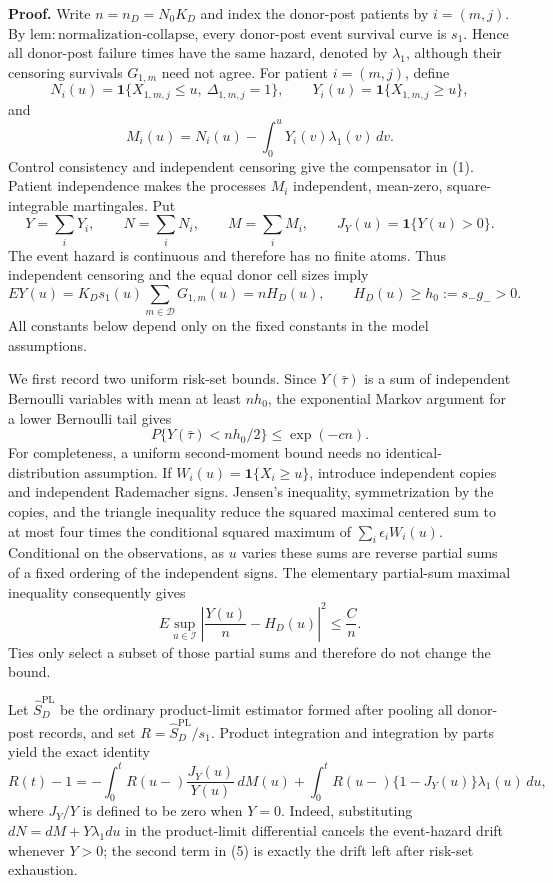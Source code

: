 \textbf{Proof.}
Write \(n=n_D=N_0K_D\) and index the donor-post patients by \(i=(m,j)\).  By \(\mathrm{lem:normalization\mbox{-}collapse}\), every donor-post event survival curve is \(s_1\).  Hence all donor-post failure times have the same hazard, denoted by \(\lambda_1\), although their censoring survivals \(G_{1,m}\) need not agree.  For patient \(i=(m,j)\), define
\[
 N_i(u)=\mathbf 1\{X_{1,m,j}\le u,\ \Delta_{1,m,j}=1\},
 \qquad
 Y_i(u)=\mathbf 1\{X_{1,m,j}\ge u\},
\]
and
\[
 M_i(u)=N_i(u)-\int_0^uY_i(v)\lambda_1(v)\,dv.       \tag{1}
\]
Control consistency and independent censoring give the compensator in (1).  Patient independence makes the processes \(M_i\) independent, mean-zero, square-integrable martingales.  Put
\[
 Y=\sum_iY_i,\qquad N=\sum_iN_i,\qquad M=\sum_iM_i,
 \qquad J_Y(u)=\mathbf 1\{Y(u)>0\}.
\]
The event hazard is continuous and therefore has no finite atoms.  Thus independent censoring and the equal donor cell sizes imply
\[
 E Y(u)
 =K_Ds_1(u)\sum_{m\in\mathcal D}G_{1,m}(u)
 =nH_D(u),
 \qquad H_D(u)\ge h_0:=s_-g_->0.                       \tag{2}
\]
All constants below depend only on the fixed constants in the model assumptions.

We first record two uniform risk-set bounds.  Since \(Y(\bar\tau)\) is a sum of independent Bernoulli variables with mean at least \(nh_0\), the exponential Markov argument for a lower Bernoulli tail gives
\[
 P\{Y(\bar\tau)<nh_0/2\}\le \exp(-c n).               \tag{3}
\]
For completeness, a uniform second-moment bound needs no identical-distribution assumption.  If \(W_i(u)=\mathbf 1\{X_i\ge u\}\), introduce independent copies and independent Rademacher signs.  Jensen's inequality, symmetrization by the copies, and the triangle inequality reduce the squared maximal centered sum to at most four times the conditional squared maximum of
\(\sum_i\epsilon_iW_i(u)\).  Conditional on the observations, as \(u\) varies these sums are reverse partial sums of a fixed ordering of the independent signs.  The elementary partial-sum maximal inequality consequently gives
\[
 E\sup_{u\in\mathcal I}
 \left|\frac{Y(u)}n-H_D(u)\right|^2\le \frac Cn.       \tag{4}
\]
Ties only select a subset of those partial sums and therefore do not change the bound.

Let \(\widehat S_D^{\mathrm{PL}}\) be the ordinary product-limit estimator formed after pooling all donor-post records, and set
\(R=\widehat S_D^{\mathrm{PL}}/s_1\).  Product integration and integration by parts yield the exact identity
\[
 R(t)-1
 =-\int_0^tR(u-)\frac{J_Y(u)}{Y(u)}\,dM(u)
  +\int_0^tR(u-)\{1-J_Y(u)\}\lambda_1(u)\,du,          \tag{5}
\]
where \(J_Y/Y\) is defined to be zero when \(Y=0\).  Indeed, substituting
\(dN=dM+Y\lambda_1du\) in the product-limit differential cancels the event-hazard drift whenever \(Y>0\); the second term in (5) is exactly the drift left after risk-set exhaustion.

